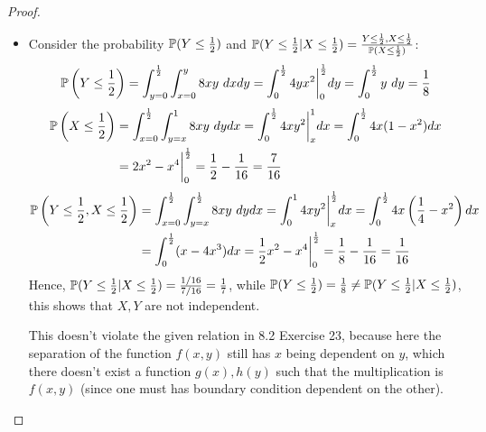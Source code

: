 \documentclass{article}
\begin{document}
\begin{proof}
\begin{itemize}
        \item[(b)] Consider the probability $\mathbb{P}(Y\leq \frac{1}{2})$ and $\mathbb{P}(Y\leq \frac{1}{2}|X\leq \frac{1}{2}) = \frac{Y\leq \frac{1}{2},X\leq \frac{1}{2}}{\mathbb{P}(X\leq \frac{1}{2})}$: 
        \begin{align}
            \mathbb{P}\left(Y\leq \frac{1}{2}\right) = \int_{y=0}^{\frac{1}{2}}\int_{x=0}^{y}8xy\ dx dy = \int_{0}^{\frac{1}{2}}4yx^2\bigg|_{0}^{\frac{1}{2}}dy = \int_{0}^{\frac{1}{2}}y\ dy = \frac{1}{8}
        \end{align}
        \begin{align}
            \mathbb{P}\left(X\leq \frac{1}{2}\right) &= \int_{x=0}^{\frac{1}{2}}\int_{y=x}^{1}8xy\ dydx = \int_{0}^{\frac{1}{2}}4xy^2\bigg|_{x}^{1}dx = \int_{0}^{\frac{1}{2}}4x(1-x^2)dx \\
            &=  2x^2-x^4\bigg|_{0}^{\frac{1}{2}} = \frac{1}{2} - \frac{1}{16} = \frac{7}{16}
        \end{align}
        \begin{align}
            \PP\left(Y\leq \frac{1}{2},X\leq \frac{1}{2}\right)&=\int_{x=0}^{\frac{1}{2}}\int_{y=x}^{\frac{1}{2}}8xy\ dydx = \int_{0}^{1}4xy^2\bigg|_{x}^{\frac{1}{2}}dx = \int_{0}^{\frac{1}{2}}4x\left(\frac{1}{4}-x^2\right)dx\\
            &= \int_{0}^{\frac{1}{2}}(x-4x^3)dx = \frac{1}{2}x^2-x^4\bigg|_{0}^{\frac{1}{2}} = \frac{1}{8}-\frac{1}{16} = \frac{1}{16}
        \end{align}
        Hence, $\mathbb{P}(Y\leq\frac{1}{2}|X\leq \frac{1}{2})=\frac{1/16}{7/16} = \frac{1}{7}$, while $\mathbb{P}(Y\leq \frac{1}{2})=\frac{1}{8}\neq \mathbb{P}(Y\leq \frac{1}{2}|X\leq \frac{1}{2})$, this shows that $X,Y$ are not independent.

        This doesn't violate the given relation in 8.2 Exercise 23, because here the separation of the function $f(x,y)$ still has $x$ being dependent on $y$, which there doesn't exist a function $g(x), h(y)$ such that the multiplication is $f(x,y)$ (since one must has boundary condition dependent on the other).
    \end{itemize}
\end{proof}
\end{document}
